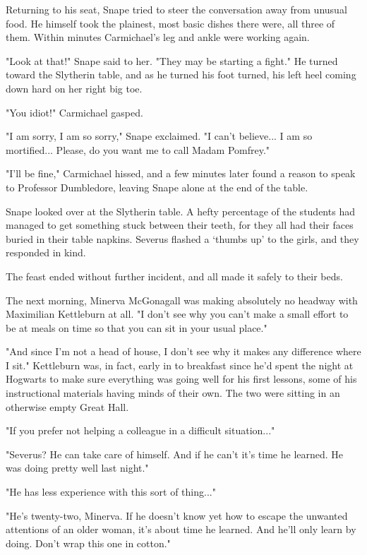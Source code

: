Returning to his seat, Snape tried to steer the conversation away from unusual food. He himself took the plainest, most basic dishes there were, all three of them. Within minutes Carmichael's leg and ankle were working again.

"Look at that!" Snape said to her. "They may be starting a fight." He turned toward the Slytherin table, and as he turned his foot turned, his left heel coming down hard on her right big toe.

"You idiot!" Carmichael gasped.

"I am sorry, I am so sorry," Snape exclaimed. "I can't believe... I am so mortified... Please, do you want me to call Madam Pomfrey."

"I'll be fine," Carmichael hissed, and a few minutes later found a reason to speak to Professor Dumbledore, leaving Snape alone at the end of the table.

Snape looked over at the Slytherin table. A hefty percentage of the students had managed to get something stuck between their teeth, for they all had their faces buried in their table napkins. Severus flashed a `thumbs up' to the girls, and they responded in kind.

The feast ended without further incident, and all made it safely to their beds.

The next morning, Minerva McGonagall was making absolutely no headway with Maximilian Kettleburn at all. "I don't see why you can't make a small effort to be at meals on time so that you can sit in your usual place."

"And since I'm not a head of house, I don't see why it makes any difference where I sit." Kettleburn was, in fact, early in to breakfast since he'd spent the night at Hogwarts to make sure everything was going well for his first lessons, some of his instructional materials having minds of their own. The two were sitting in an otherwise empty Great Hall.

"If you prefer not helping a colleague in a difficult situation..."

"Severus? He can take care of himself. And if he can't it's time he learned. He was doing pretty well last night."

"He has less experience with this sort of thing..."

"He's twenty-two, Minerva. If he doesn't know yet how to escape the unwanted attentions of an older woman, it's about time he learned. And he'll only learn by doing. Don't wrap this one in cotton."

